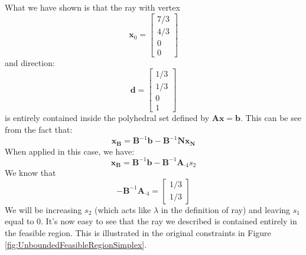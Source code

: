 \begin{example}
What we have shown is that the ray with vertex
\begin{displaymath}
\mathbf{x}_0 = \begin{bmatrix}
7/3\\
4/3\\
0\\
0
\end{bmatrix}
\end{displaymath}
and direction:
\begin{displaymath}
\mathbf{d} = \begin{bmatrix}
1/3\\
1/3\\
0\\
1
\end{bmatrix}
\end{displaymath}
is entirely contained inside the polyhedral set defined by $\mathbf{A}\mathbf{x} = \mathbf{b}$. This can be see from the fact that:
\begin{displaymath}
\mathbf{x_B} = \mathbf{B}^{-1}\mathbf{b} - \mathbf{B}^{-1}\mathbf{N}\mathbf{x_N}
\end{displaymath}
When applied in this case, we have:
\begin{displaymath}
\mathbf{x_B} = \mathbf{B}^{-1}\mathbf{b} - \mathbf{B}^{-1}\mathbf{A}_{\cdot 4}s_2
\end{displaymath}
We know that
\begin{displaymath}
-\mathbf{B}^{-1}\mathbf{A}_{\cdot 4} = 
\begin{bmatrix}
1/3\\
1/3
\end{bmatrix}
\end{displaymath}
We will be increasing $s_2$ (which acts like $\lambda$ in the definition of ray) and leaving $s_1$ equal to $0$. It's now easy to see that the ray we described is contained entirely in the feasible region. This is illustrated in the original constraints in Figure \ref{fig:UnboundedFeasibleRegionSimplex}.
\begin{figure}[htbp]
\centering

\end{figure}
\end{example}
